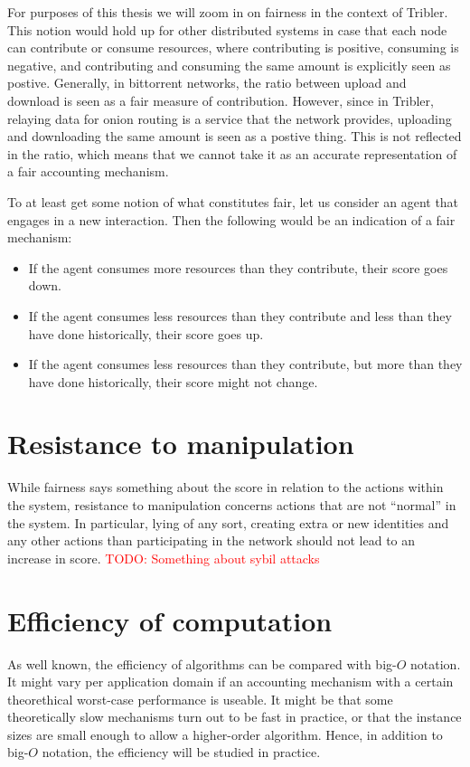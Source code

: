 \documentclass[a4paper,11pt]{book}
\newcommand\musthave[1]{\textcolor{red}{TODO: #1}}
\theoremstyle{definition}
\begin{document}
For purposes of this thesis we will zoom in on fairness in the context of Tribler.
This notion would hold up for other distributed systems in case that each node
can contribute or consume resources, where contributing is positive, consuming
is negative, and contributing and consuming the same amount is explicitly seen as postive.
Generally, in bittorrent networks, the ratio between upload and download is seen
as a fair measure of contribution. However, since in Tribler, relaying data for onion
routing is a service that the network provides, uploading and downloading the same
amount is seen as a postive thing. This is not reflected in the ratio, which
means that we cannot take it as an accurate representation of a fair accounting mechanism.

To at least get some notion of what constitutes fair, let us consider an agent that
engages in a new interaction. Then the following would be an indication of a fair mechanism:

\begin{itemize}
    \item If the agent consumes more resources than they contribute, their score goes down.
    \item If the agent consumes less resources than they contribute and less than they have
        done historically, their score goes up.
     \item If the agent consumes less resources than they contribute, but more than they have
        done historically, their score might not change.
\end{itemize}

\section{Resistance to manipulation}

While fairness says something about the score in relation to the actions within
the system, resistance to manipulation concerns actions that are not ``normal''
in the system. In particular, lying of any sort, creating extra or new identities
and any other actions than participating in the network should not lead to an
increase in score. \musthave{Something about sybil attacks}

\section{Efficiency of computation}

As well known, the efficiency of algorithms can be compared with big-$O$ notation.
It might vary per application domain if an accounting mechanism with a certain
theorethical worst-case performance is useable. It might be that some
theoretically slow mechanisms turn out to be fast in practice, or that the
instance sizes are small enough to allow a higher-order algorithm. Hence,
in addition to big-$O$ notation, the efficiency will be studied in practice.
\end{document}
